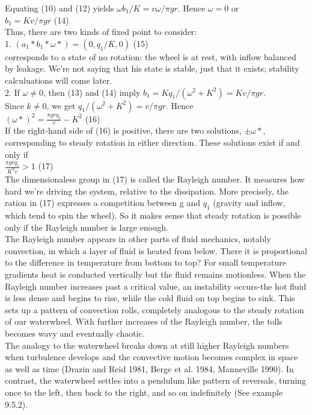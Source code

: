 \documentclass{article}
\newcommand\tab[1][1cm]{\hspace*{#1}}
\begin{document}
Equating (10) and (12) yields $\omega b_{1}/K=v\omega/\pi gr$. Hence $\omega = 0$ or \\
\tab \tab 
$b_{1}=Kv/\pi gr$ \tab (14) \\
Thus, there are two kinds of fixed point to consider: \\ \tab \tab
1. $(a_{1}*b_{1}*\omega * ) = (0, q_{1}/K, 0)$ \tab (15) \\
corresponds to a state of no rotation: the wheel is at rest, with inflow balanced by leakage. We're not saying that his state is stable, just that it exists; stability calculuations will come later. \\ \tab \tab
2. If $\omega \neq 0$, then (13) and (14) imply $b_{1}=Kq_{1}/(\omega^{2}+K^{2})=Kv/\pi gr$. \\ \tab \tab Since $k \neq 0$, we get $q_{1}/(\omega^{2}+K^{2})=v/\pi gr$. Hence \\ \tab \tab
$(\omega *)^{2}=\frac{\pi gr q_{1}}{v}-K^{2}$ \tab (16) \\
If the right-hand side of (16) is positive, there are two solutions, $\pm \omega *$, corresponding to steady rotation in either direction. These solutions exist if and only if \\ \tab \tab
$\frac{\pi gr q_{1}}{K^{2} v}> 1$ \tab (17) \\
\tab
The dimensionaless group in (17) is called the Rayleigh number. It measures how hard we're driving the system, relative to the dissipation. More precisely, the ration in (17) expresses a competition between g and $q_{1}$ (gravity and inflow, which tend to spin the wheel). So it makes sense that steady rotation is possible only if the Rayleigh number is large enough. \\ \tab The Rayleigh number appears in other parts of fluid mechanics, notably convection, in which a layer of fluid is heated from below. There it is proportional to the difference in temperature from bottom to top? For small temperature gradients heat is conducted vertically but the fluid remains motionless. When the Rayleigh number increases past a critical value, an instability occurs-the hot fluid is less dense and begins to rise, while the cold fluid on top begins to sink. This sets up a pattern of convection rolls, completely analogous to the steady rotation of our waterwheel. With further increases of the Rayleigh number, the tolls becomes wavy and eventually chaotic. \\ \tab
The analogy to the waterwheel breaks down at still higher Rayleigh numbers when turbulence develops and the convective motion becomes complex in space as well as time (Drazin and Reid 1981, Berge et al. 1984, Manneville 1990). In contrast, the waterwheel settles into a pendulum like pattern of reversals, turning once to the left, then back to the right, and so on indefinitely (See example 9.5.2).
\end{document}
